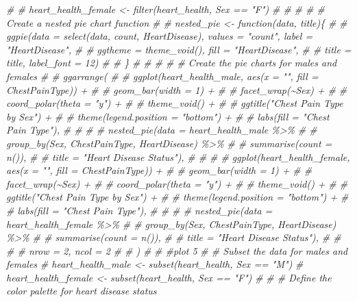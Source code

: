 \documentclass[
]{article}
\newenvironment{Shaded}{\begin{snugshade}}{\end{snugshade}}
\newcommand{\CommentTok}[1]{\textcolor[rgb]{0.56,0.35,0.01}{\textit{#1}}}
\begin{document}
\begin{Shaded}
\begin{Highlighting}[]
\CommentTok{\# \# heart\_health\_female \textless{}{-} filter(heart\_health, Sex == "F")}
\CommentTok{\# \# }
\CommentTok{\# \# \# Create a nested pie chart function}
\CommentTok{\# \# nested\_pie \textless{}{-} function(data, title)\{}
\CommentTok{\# \#   ggpie(data = select(data, count, HeartDisease), values = "count", label = "HeartDisease", }
\CommentTok{\# \#         ggtheme = theme\_void(), fill = "HeartDisease",}
\CommentTok{\# \#         title = title, label\_font = 12)}
\CommentTok{\# \# \}}
\CommentTok{\# \# }
\CommentTok{\# \# \# Create the pie charts for males and females}
\CommentTok{\# \# ggarrange(}
\CommentTok{\# \#   ggplot(heart\_health\_male, aes(x = "", fill = ChestPainType)) +}
\CommentTok{\# \#     geom\_bar(width = 1) +}
\CommentTok{\# \#     facet\_wrap(\textasciitilde{}Sex) +}
\CommentTok{\# \#     coord\_polar(theta = "y") +}
\CommentTok{\# \#     theme\_void() +}
\CommentTok{\# \#     ggtitle("Chest Pain Type by Sex") +}
\CommentTok{\# \#     theme(legend.position = "bottom") +}
\CommentTok{\# \#     labs(fill = "Chest Pain Type"),}
\CommentTok{\# \#   }
\CommentTok{\# \#   nested\_pie(data = heart\_health\_male \%\textgreater{}\% }
\CommentTok{\# \#                group\_by(Sex, ChestPainType, HeartDisease) \%\textgreater{}\% }
\CommentTok{\# \#                summarise(count = n()),}
\CommentTok{\# \#              title = "Heart Disease Status"),}
\CommentTok{\# \#   }
\CommentTok{\# \#   ggplot(heart\_health\_female, aes(x = "", fill = ChestPainType)) +}
\CommentTok{\# \#     geom\_bar(width = 1) +}
\CommentTok{\# \#     facet\_wrap(\textasciitilde{}Sex) +}
\CommentTok{\# \#     coord\_polar(theta = "y") +}
\CommentTok{\# \#     theme\_void() +}
\CommentTok{\# \#     ggtitle("Chest Pain Type by Sex") +}
\CommentTok{\# \#     theme(legend.position = "bottom") +}
\CommentTok{\# \#     labs(fill = "Chest Pain Type"),}
\CommentTok{\# \#   }
\CommentTok{\# \#   nested\_pie(data = heart\_health\_female \%\textgreater{}\% }
\CommentTok{\# \#                group\_by(Sex, ChestPainType, HeartDisease) \%\textgreater{}\% }
\CommentTok{\# \#                summarise(count = n()),}
\CommentTok{\# \#              title = "Heart Disease Status"),}
\CommentTok{\# \#   }
\CommentTok{\# \#   nrow = 2, ncol = 2}
\CommentTok{\# \# )}
\CommentTok{\# }
\CommentTok{\# \#plot 5}
\CommentTok{\# \# Subset the data for males and females}
\CommentTok{\# heart\_health\_male \textless{}{-} subset(heart\_health, Sex == "M")}
\CommentTok{\# heart\_health\_female \textless{}{-} subset(heart\_health, Sex == "F")}
\CommentTok{\# }
\CommentTok{\# \# Define the color palette for heart disease status}

\end{Highlighting}
\end{Shaded}
\end{document}
